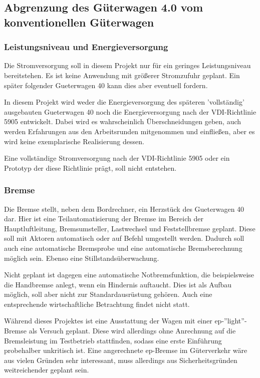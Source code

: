 \subsection{Abgrenzung des Güterwagen 4.0 vom konventionellen Güterwagen}
\subsubsection{Leistungsniveau und Energieversorgung}
Die Stromversorgung soll in diesem Projekt nur für ein geringes Leistungsniveau bereitstehen. Es ist keine Anwendung mit größerer Stromzufuhr geplant. Ein später folgender \gls{Gueterwagen 40}  kann dies aber eventuell fordern.\par
In diesem Projekt wird weder die Energieversorgung des späteren 'vollständig' ausgebauten \gls{Gueterwagen 40} noch die Energieversorgung nach der VDI-Richtlinie 5905 entwickelt. Dabei wird es wahrscheinlich Überschneidungen geben, auch werden Erfahrungen aus den Arbeitsrunden mitgenommen und einfließen, aber es wird keine exemplarische Realisierung dessen.\par
Eine vollständige Stromversorgung nach der VDI-Richtlinie 5905 oder ein Prototyp der diese Richtlinie prägt, soll nicht entstehen. 

\subsubsection{Bremse}
Die Bremse stellt, neben dem Bordrechner, ein Herzstück des \gls{Gueterwagen 40}  dar.
Hier ist eine Teilautomatisierung der Bremse im Bereich der Hauptluftleitung, Bremsumsteller, \gls{Lastwechsel} und Feststellbremse geplant. Diese soll mit Aktoren automatisch oder auf Befehl umgestellt werden. Dadurch soll auch eine automatische Bremsprobe und eine automatische Bremsberechnung möglich sein. Ebenso eine Stillstandsüberwachung.\par
Nicht geplant ist dagegen eine automatische Notbremsfunktion, die beispielsweise die Handbremse anlegt, wenn ein Hindernis auftaucht. Dies ist als Aufbau möglich, soll aber nicht zur Standardausrüstung gehören. Auch eine entsprechende wirtschaftliche Betrachtung findet nicht statt.\par
Während dieses Projektes ist eine Ausstattung der Wagen mit einer ep-''light''-Bremse als Versuch geplant. Diese wird allerdings ohne Anrechnung auf die Bremsleistung im Testbetrieb stattfinden, sodass eine erste Einführung probehalber unkritisch ist. Eine angerechnete ep-Bremse im Güterverkehr wäre aus vielen Gründen sehr interessant, muss allerdings aus Sicherheitsgründen weitreichender geplant sein.\par

